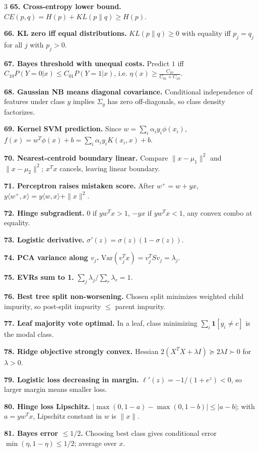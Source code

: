 \documentclass[8pt,fleqn]{extarticle}
\begin{document}
\begin{multicols}{3}
\textbf{65. Cross-entropy lower bound.} $CE(p,q)=H(p)+KL(p\|q)\ge H(p)$.

\textbf{66. KL zero iff equal distributions.} $KL(p\|q)\ge0$ with equality iff $p_j=q_j$ for all $j$ with $p_j>0$.

\textbf{67. Bayes threshold with unequal costs.} Predict $1$ iff $C_{10}P(Y=0|x)\le C_{01}P(Y=1|x)$, i.e. $\eta(x)\ge \frac{C_{10}}{C_{01}+C_{10}}$.

\textbf{68. Gaussian NB means diagonal covariance.} Conditional independence of features under class $y$ implies $\Sigma_y$ has zero off-diagonals, so class density factorizes.

\textbf{69. Kernel SVM prediction.} Since $w=\sum_i\alpha_i y_i\phi(x_i)$, $f(x)=w^T\phi(x)+b=\sum_i\alpha_i y_i K(x_i,x)+b$.

\textbf{70. Nearest-centroid boundary linear.} Compare $\|x-\mu_1\|^2$ and $\|x-\mu_2\|^2$; $x^Tx$ cancels, leaving linear boundary.

\textbf{71. Perceptron raises mistaken score.} After $w^+=w+yx$, $y\langle w^+,x\rangle=y\langle w,x\rangle+\|x\|^2$.

\textbf{72. Hinge subgradient.} $0$ if $yw^Tx>1$, $-yx$ if $yw^Tx<1$, any convex combo at equality.

\textbf{73. Logistic derivative.} $\sigma'(z)=\sigma(z)(1-\sigma(z))$.

\textbf{74. PCA variance along $v_j$.} $\mathrm{Var}(v_j^Tx)=v_j^TSv_j=\lambda_j$.

\textbf{75. EVRs sum to 1.} $\sum_j \lambda_j/\sum_r\lambda_r=1$.

\textbf{76. Best tree split non-worsening.} Chosen split minimizes weighted child impurity, so post-split impurity $\le$ parent impurity.

\textbf{77. Leaf majority vote optimal.} In a leaf, class minimizing $\sum_i\mathbf1[y_i\neq c]$ is the modal class.

\textbf{78. Ridge objective strongly convex.} Hessian $2(X^TX+\lambda I)\succeq 2\lambda I\succ0$ for $\lambda>0$.

\textbf{79. Logistic loss decreasing in margin.} $\ell'(z)=-1/(1+e^z)<0$, so larger margin means smaller loss.

\textbf{80. Hinge loss Lipschitz.} $|\max(0,1-a)-\max(0,1-b)|\le |a-b|$; with $a=yw^Tx$, Lipschitz constant in $w$ is $\|x\|$.

\textbf{81. Bayes error $\le 1/2$.} Choosing best class gives conditional error $\min(\eta,1-\eta)\le 1/2$; average over $x$.


\end{multicols}
\end{document}
